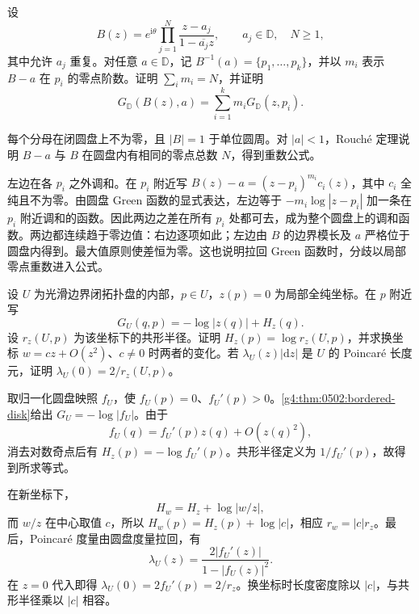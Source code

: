 \BookExercises

\begin{exercise}
	\label{g4:ex:0501:blaschke-green}
	设
	\[
		B(z)=e^{\mathrm{i}\theta}\prod_{j=1}^N\frac{z-a_j}{1-\overline{a_j}z},
		\qquad a_j\in\mathbb D,\quad N\ge1,
	\]
	其中允许 \(a_j\) 重复。对任意 \(a\in\mathbb D\)，记 \(B^{-1}(a)=\{p_1,\ldots,p_k\}\)，并以 \(m_i\) 表示 \(B-a\) 在 \(p_i\) 的零点阶数。证明 \(\sum_i m_i=N\)，并证明
	\[
		G_{\mathbb D}(B(z),a)=\sum_{i=1}^k m_iG_{\mathbb D}(z,p_i).
	\]
\end{exercise}
\begin{solution}
	每个分母在闭圆盘上不为零，且 \(|B|=1\) 于单位圆周。对 \(|a|<1\)，Rouché 定理说明 \(B-a\) 与 \(B\) 在圆盘内有相同的零点总数 \(N\)，得到重数公式。

	左边在各 \(p_i\) 之外调和。在 \(p_i\) 附近写 \(B(z)-a=(z-p_i)^{m_i}c_i(z)\)，其中 \(c_i\) 全纯且不为零。由圆盘 Green 函数的显式表达，左边等于 \(-m_i\log|z-p_i|\) 加一条在 \(p_i\) 附近调和的函数。因此两边之差在所有 \(p_i\) 处都可去，成为整个圆盘上的调和函数。两边都连续趋于零边值：右边逐项如此；左边由 \(B\) 的边界模长及 \(a\) 严格位于圆盘内得到。最大值原则使差恒为零。这也说明拉回 Green 函数时，分歧以局部零点重数进入公式。
\end{solution}

\begin{exercise}
	\label{g4:ex:0502:robin-radius}
	设 \(U\) 为光滑边界闭拓扑盘的内部，\(p\in U\)，\(z(p)=0\) 为局部全纯坐标。在 \(p\) 附近写
	\[
		G_U(q,p)=-\log|z(q)|+H_z(q).
	\]
	设 \(r_z(U,p)\) 为该坐标下的共形半径。证明 \(H_z(p)=\log r_z(U,p)\)，并求换坐标 \(w=cz+O(z^2)\)、\(c\ne0\) 时两者的变化。若 \(\lambda_U(z)|\mathrm{d}z|\) 是 \(U\) 的 Poincaré 长度元，证明 \(\lambda_U(0)=2/r_z(U,p)\)。
\end{exercise}
\begin{solution}
	取归一化圆盘映照 \(f_U\)，使 \(f_U(p)=0\)、\(f_U'(p)>0\)。\cref{g4:thm:0502:bordered-disk}给出 \(G_U=-\log|f_U|\)。由于
	\[
		f_U(q)=f_U'(p)z(q)+O(z(q)^2),
	\]
	消去对数奇点后有 \(H_z(p)=-\log f_U'(p)\)。共形半径定义为 \(1/f_U'(p)\)，故得到所求等式。

	在新坐标下，
	\[
		H_w=H_z+\log|w/z|,
	\]
	而 \(w/z\) 在中心取值 \(c\)，所以 \(H_w(p)=H_z(p)+\log|c|\)，相应 \(r_w=|c|r_z\)。最后，Poincaré 度量由圆盘度量拉回，有
	\[
		\lambda_U(z)=\frac{2|f_U'(z)|}{1-|f_U(z)|^2}.
	\]
	在 \(z=0\) 代入即得 \(\lambda_U(0)=2f_U'(p)=2/r_z\)。换坐标时长度密度除以 \(|c|\)，与共形半径乘以 \(|c|\) 相容。
\end{solution}

